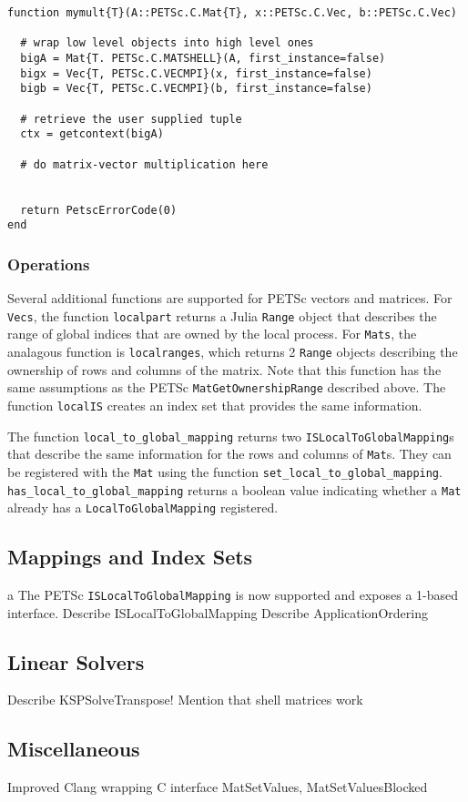\documentclass{article}
\begin{document}
\begin{verbatim}
function mymult{T}(A::PETSc.C.Mat{T}, x::PETSc.C.Vec, b::PETSc.C.Vec)

  # wrap low level objects into high level ones
  bigA = Mat{T. PETSc.C.MATSHELL}(A, first_instance=false)
  bigx = Vec{T, PETSc.C.VECMPI}(x, first_instance=false)
  bigb = Vec{T, PETSc.C.VECMPI}(b, first_instance=false)

  # retrieve the user supplied tuple
  ctx = getcontext(bigA)

  # do matrix-vector multiplication here
  

  return PetscErrorCode(0)
end
\end{verbatim}


\subsubsection{Operations}
Several additional functions are supported for PETSc vectors and matrices.
For \texttt{Vecs}, the function \texttt{localpart} returns a Julia \texttt{Range} object that describes the range of global indices that are owned by the 
local process.
For \texttt{Mats}, the analagous function is \texttt{localranges}, which 
returns 2 \texttt{Range} objects describing the ownership of rows and columns
of the matrix.  Note that this function has the same assumptions as the PETSc
\texttt{MatGetOwnershipRange} described above.
The function \texttt{localIS} creates an index set that provides the same 
information.

The function \texttt{local\_to\_global\_mapping} returns two 
\texttt{ISLocalToGlobalMapping}s that describe the same information for 
the rows and columns of \texttt{Mat}s.  They can be registered with the
\texttt{Mat} using the function \texttt{set\_local\_to\_global\_mapping}.
\texttt{has\_local\_to\_global\_mapping} returns a boolean value indicating
whether a \texttt{Mat} already has a \texttt{LocalToGlobalMapping} registered.

\subsection{Mappings and Index Sets} \label{sec:is}a
The PETSc \texttt{ISLocalToGlobalMapping} is now supported and exposes a 
1-based interface.
Describe ISLocalToGlobalMapping
Describe ApplicationOrdering


\subsection{Linear Solvers} \label{sec:ksp}
Describe KSPSolveTranspose!
Mention that shell matrices work

\subsection{Miscellaneous}
Improved Clang wrapping
C interface MatSetValues, MatSetValuesBlocked
\end{document}
